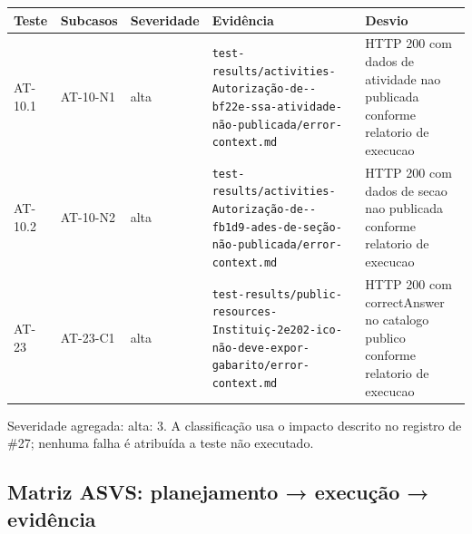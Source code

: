 {\def\LTcaptype{none} %
\begin{longtable}[]{@{}
  >{\raggedright\arraybackslash}p{}
  >{\raggedright\arraybackslash}p{}
  >{\raggedright\arraybackslash}p{}
  >{\raggedright\arraybackslash}p{}
  >{\raggedright\arraybackslash}p{}@{}}
\toprule\noalign{}
\begin{minipage}[b]{\linewidth}\raggedright
Teste
\end{minipage} & \begin{minipage}[b]{\linewidth}\raggedright
Subcasos
\end{minipage} & \begin{minipage}[b]{\linewidth}\raggedright
Severidade
\end{minipage} & \begin{minipage}[b]{\linewidth}\raggedright
Evidência
\end{minipage} & \begin{minipage}[b]{\linewidth}\raggedright
Desvio
\end{minipage} \\
\midrule\noalign{}
\endhead
\bottomrule\noalign{}
\endlastfoot
AT-10.1 & AT-10-N1 & alta &
\texttt{test-results/\allowbreak{}activities-Autorização-de-\/-bf22e-ssa-atividade-não-publicada/\allowbreak{}error-context.md}
& HTTP 200 com dados de atividade nao publicada conforme relatorio de
execucao \\
AT-10.2 & AT-10-N2 & alta &
\texttt{test-results/\allowbreak{}activities-Autorização-de-\/-fb1d9-ades-de-seção-não-publicada/\allowbreak{}error-context.md}
& HTTP 200 com dados de secao nao publicada conforme relatorio de
execucao \\
AT-23 & AT-23-C1 & alta &
\texttt{test-results/\allowbreak{}public-resources-Instituiç-2e202-ico-não-deve-expor-gabarito/\allowbreak{}error-context.md}
& HTTP 200 com correctAnswer no catalogo publico conforme relatorio de
execucao \\
\end{longtable}
}

Severidade agregada: alta: 3. A classificação usa o impacto descrito no
registro de \#27; nenhuma falha é atribuída a teste não executado.

\subsection{Matriz ASVS: planejamento → execução →
evidência}\label{matriz-asvs-planejamento-execuuxe7uxe3o-eviduxeancia}

